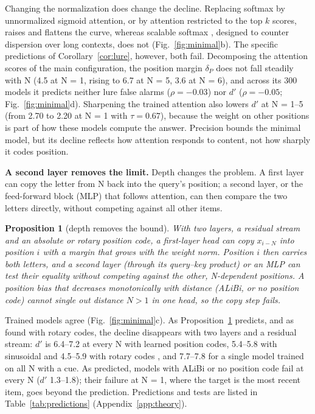 \documentclass{article}
\newtheorem{proposition}{Proposition}
\newcommand{\dprime}{$d'$}
\begin{document}
Changing the normalization does change the decline. Replacing softmax by unnormalized sigmoid attention, or by attention restricted to the top $k$ scores, raises and flattens the curve, whereas scalable softmax \citep{nakanishi2025scalable}, designed to counter dispersion over long contexts, does not (Fig.~\ref{fig:minimal}b). The specific predictions of Corollary~\ref{cor:lure}, however, both fail. Decomposing the attention scores of the main configuration, the position margin $\delta_P$ does not fall steadily with N (4.5 at N = 1, rising to 6.7 at N = 5, 3.6 at N = 6), and across its 300 models it predicts neither lure false alarms ($\rho=-0.03$) nor \dprime{} ($\rho=-0.05$; Fig.~\ref{fig:minimal}d). Sharpening the trained attention also lowers \dprime{} at N = 1--5 (from 2.70 to 2.20 at N = 1 with $\tau=0.67$), because the weight on other positions is part of how these models compute the answer. Precision bounds the minimal model, but its decline reflects how attention responds to content, not how sharply it codes position.

\textbf{A second layer removes the limit.} Depth changes the problem. A first layer can copy the letter from N back into the query's position; a second layer, or the feed-forward block (MLP) that follows attention, can then compare the two letters directly, without competing against all other items.

\begin{proposition}[depth removes the bound]\label{prop:depth}
With two layers, a residual stream and an absolute or rotary position code, a first-layer head can copy $x_{i-N}$ into position $i$ with a margin that grows with the weight norm. Position $i$ then carries both letters, and a second layer (through its query--key product) or an MLP can test their equality without competing against the other, N-dependent positions. A position bias that decreases monotonically with distance (ALiBi, or no position code) cannot single out distance $N>1$ in one head, so the copy step fails.
\end{proposition}

Trained models agree (Fig.~\ref{fig:minimal}c). As Proposition~\ref{prop:depth} predicts, and as \citet{xiong2026superposition} found with rotary codes, the decline disappears with two layers and a residual stream: \dprime{} is 6.4--7.2 at every N with learned position codes, 5.4--5.8 with sinusoidal and 4.5--5.9 with rotary codes \citep{su2021roformer}, and 7.7--7.8 for a single model trained on all N with a cue. As predicted, models with ALiBi \citep{press2022alibi} or no position code fail at every N (\dprime{} 1.3--1.8); their failure at N = 1, where the target is the most recent item, goes beyond the prediction. Predictions and tests are listed in Table~\ref{tab:predictions} (Appendix~\ref{app:theory}).
\end{document}
